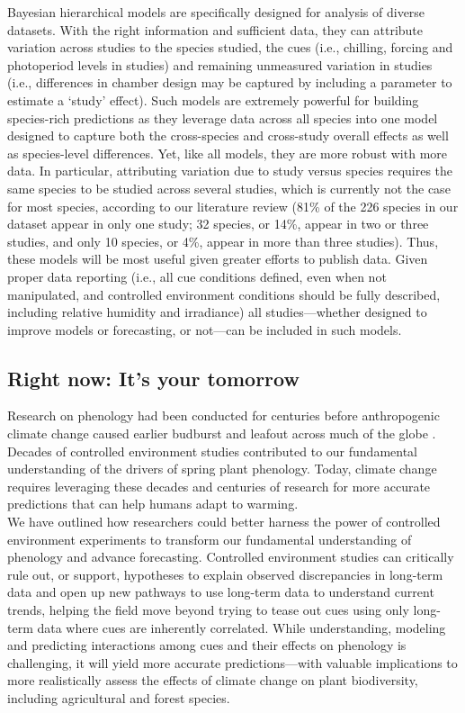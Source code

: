 \documentclass[11pt,letter]{article}
\begin{document}
Bayesian hierarchical models are specifically designed for analysis of diverse datasets. With the right information and sufficient data, they can attribute variation across studies to the species studied, the cues (i.e., chilling, forcing and photoperiod levels in studies) and remaining unmeasured variation in studies (i.e., differences in chamber design may be captured by including a parameter to estimate a `study' effect). Such models are extremely powerful for building species-rich predictions as they leverage data across all species into one model designed to capture both the cross-species and cross-study overall effects as well as species-level differences. Yet, like all models, they are more robust with more data. In particular, attributing variation due to study versus species requires the same species to be studied across several studies, which is currently not the case for most species, according to our literature review (81\% of the 226 species in our dataset appear in only one study; 32 species, or 14\%, appear in two or  three studies, and only 10 species, or 4\%, appear in more than three studies). Thus, these models will be most useful given greater efforts to publish data. Given proper data reporting (i.e., all cue conditions defined, even when not manipulated, and controlled environment conditions should be fully described, including relative humidity and irradiance) all studies---whether designed to improve models or forecasting, or not---can be included in such models. 

\subsection{Right now: It's your tomorrow}
Research on phenology had been conducted for centuries before anthropogenic climate change caused earlier budburst and leafout across much of the globe \citep{Lamb:1948aa,Sparks:1995mv}. Decades of controlled environment studies contributed to our fundamental understanding of the drivers of spring plant phenology. Today, climate change requires leveraging these decades and centuries of research for more accurate predictions that can help humans adapt to warming. \\

We have outlined how researchers could better harness the power of controlled environment experiments to transform our fundamental understanding of phenology and advance forecasting. Controlled environment studies can critically rule out, or support, hypotheses to explain observed discrepancies in long-term data and open up new pathways to use long-term data to understand current trends, helping the field move beyond trying to tease out cues using only long-term data where cues are inherently correlated. While understanding, modeling and predicting interactions among cues and their effects on phenology is challenging, it will yield more accurate predictions---with valuable implications to more realistically assess the effects of climate change on plant biodiversity, including agricultural and forest species. 
\end{document}
